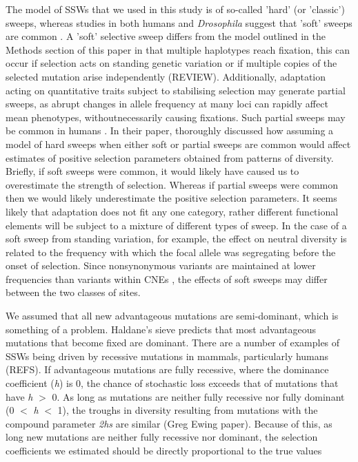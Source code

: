 \documentclass[11pt]{article}
\begin{document}
	The model of SSWs that we used in this study is of so-called 'hard' (or 'classic') sweeps, whereas studies in both humans and \textit{Drosophila} suggest that 'soft' sweeps are common \citep{RN303, RN208, RN338}. A 'soft' selective sweep differs from the model outlined in the Methods section of this paper in that multiple haplotypes reach fixation, this can occur if selection acts on standing genetic variation or if multiple copies of the selected mutation arise independently (REVIEW). Additionally, adaptation acting on quantitative traits subject to stabilising selection may generate partial sweeps, as abrupt changes in allele frequency at many loci can rapidly affect mean phenotypes, withoutnecessarily causing fixations. Such partial sweeps may be common in humans \citep{RN301}. In their paper, \cite{RN274} thoroughly discussed how assuming a model of hard sweeps when either soft or partial sweeps are common would affect estimates of positive selection parameters obtained from patterns of diversity. Briefly, if soft sweeps were common, it would likely have caused us to overestimate the strength of selection. Whereas if partial sweeps were common then we would likely underestimate the positive selection parameters. It seems likely that adaptation does not fit any one category, rather different functional elements will be subject to a mixture of different types of sweep. In the case of a soft sweep from standing variation, for example, the effect on neutral diversity is related to the frequency with which the focal allele was segregating before the onset of selection. Since nonsynonymous variants are maintained at lower frequencies than variants within CNEs \citep{RN122}, the effects of soft sweeps may differ between the two classes of sites.

	We assumed that all new advantageous mutations are semi-dominant, which is something of a problem. Haldane's sieve predicts that most advantageous mutations that become fixed are dominant. There are a number of examples of SSWs being driven by recessive mutations in mammals, particularly humans (REFS). If advantageous mutations are fully recessive, where the dominance coefficient (\textit{h}) is 0, the chance of stochastic loss exceeds that of mutations that have \textit{h} $>$ 0. As long as mutations are neither fully recessive nor fully dominant (0 $<$ \textit{h} $<$ 1), the troughs in diversity resulting from mutations with the compound parameter \textit{2hs} are similar (Greg Ewing paper). Because of this, as long new mutations are neither fully recessive nor dominant, the selection coefficients we estimated should be directly proportional to the true values
\end{document}
